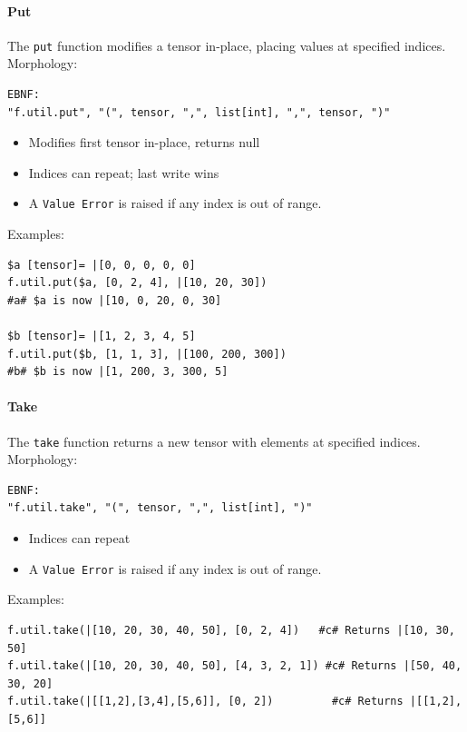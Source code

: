 \paragraph{Put}
The \texttt{put} function modifies a tensor in-place, placing values at specified indices.\\
Morphology:
\begin{verbatim}
EBNF:
"f.util.put", "(", tensor, ",", list[int], ",", tensor, ")"
\end{verbatim}
\begin{itemize}
\item Modifies first tensor in-place, returns null
\item Indices can repeat; last write wins
\item A \texttt{Value Error} is raised if any index is out of range.
\end{itemize}
Examples:
\begin{verbatim}
$a [tensor]= |[0, 0, 0, 0, 0]
f.util.put($a, [0, 2, 4], |[10, 20, 30])
#a# $a is now |[10, 0, 20, 0, 30]

$b [tensor]= |[1, 2, 3, 4, 5]
f.util.put($b, [1, 1, 3], |[100, 200, 300])
#b# $b is now |[1, 200, 3, 300, 5]
\end{verbatim}

\paragraph{Take}
The \texttt{take} function returns a new tensor with elements at specified indices.\\
Morphology:
\begin{verbatim}
EBNF:
"f.util.take", "(", tensor, ",", list[int], ")"
\end{verbatim}
\begin{itemize}
\item Indices can repeat
\item A \texttt{Value Error} is raised if any index is out of range.
\end{itemize}
Examples:
\begin{verbatim}
f.util.take(|[10, 20, 30, 40, 50], [0, 2, 4])   #c# Returns |[10, 30, 50]
f.util.take(|[10, 20, 30, 40, 50], [4, 3, 2, 1]) #c# Returns |[50, 40, 30, 20]
f.util.take(|[[1,2],[3,4],[5,6]], [0, 2])         #c# Returns |[[1,2],[5,6]]
\end{verbatim}

